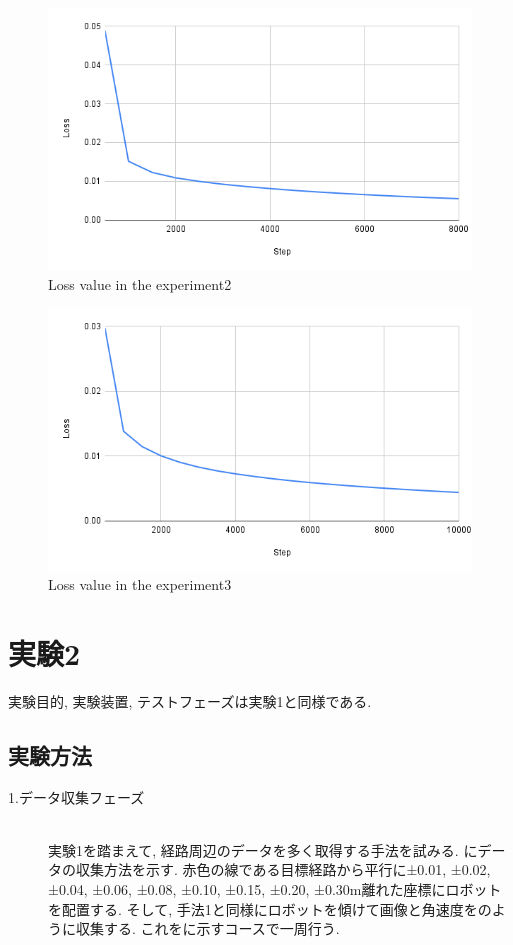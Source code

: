 \begin{figure}[h]
  \centering
  \includegraphics[keepaspectratio, scale=0.5]{images/exp1.2_8000.png}
  \caption{Loss value in the experiment2}
  \label{Fig:exp1.2_8000}
  \end{figure}

  \newpage
\begin{figure}[h]
  \centering
  \includegraphics[keepaspectratio, scale=0.5]{images/exp1.2_10000.png}
  \caption{Loss value in the experiment3}
  \label{Fig:exp1.2_10000}
  \end{figure}

\newpage
\section{実験2}
実験目的, 実験装置, テストフェーズは実験1と同様である.
\subsection{実験方法}
\begin{description}
  \item[1.データ収集フェーズ]\mbox{}\\実験1を踏まえて, 経路周辺のデータを多く取得する手法を試みる. にデータの収集方法を示す. 赤色の線である目標経路から平行に±0.01, ±0.02, ±0.04, ±0.06, ±0.08, ±0.10, ±0.15, ±0.20, ±0.30m離れた座標にロボットを配置する. そして, 手法1と同様にロボットを傾けて画像と角速度をのように収集する. これをに示すコースで一周行う.  
\end{description}

